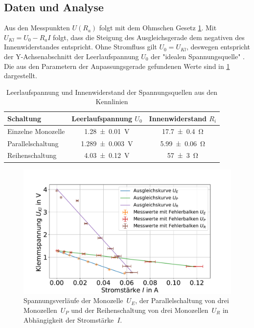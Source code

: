 \subsection{Daten und Analyse}


Aus den Messpunkten $U(R_a)$ folgt mit dem Ohmschen Gesetz \cref{fig:batt-ges-u}. Mit $U_{Kl}=U_0-R_a I$ folgt, dass die Steigung des Ausgleichsgerade dem negativen des Innenwiderstandes entspricht. Ohne Stromfluss gilt $U_0=U_{Kl}$, deswegen entspricht der Y-Achsenabschnitt der Leerlaufspannung $U_0$ der "idealen Spannungsquelle" \cite{lw}. Die aus den Parametern der Anpassungsgerade gefundenen Werte sind in \cref{tab:batt-U-R} dargestellt.





\begin{table}
	\caption{Leerlaufspannung und Innenwiderstand der Spannungsquellen aus den Kennlinien}
	\centering
	\begin{tabular}{|l||c|c|}
		\hline 
		Schaltung 	& Leerlaufspannung $U_0$ & Innenwiderstand $R_i$ \\ 
		\hline \hline
		Einzelne Monozelle	& \SI{1.28+-0.01}{V}  & \SI{17.7+-0.4}{\ohm } \\ 
		\hline  
		Parallelschaltung	& \SI{1.289+-0.003}{V } &\SI{5.99+-0.06}{\ohm }  \\ 
		\hline   
		Reihenschaltung	& \SI{4.03+-0.12}{V } &\SI{57+-3}{\ohm }  \\ 
		\hline 
	\end{tabular} 
	
	\label{tab:batt-U-R}
	
\end{table}


 


\begin{figure}
	\centering
	\includegraphics[width=0.9\linewidth]{"auswertung/Auswertung Innenwiderstand/Batterie Gesamt U"}
	\caption{Spannungsverläufe der Monozelle~$U_E$, der Parallelschaltung von drei Monozellen~$U_P$ und der Reihenschaltung von drei Monozellen~$U_R$ in Abhängigkeit der Stromstärke~$I$.}
	\label{fig:batt-ges-u}
\end{figure}










